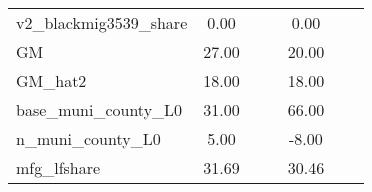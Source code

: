 \begin{table}[htbp]
\begin{tabular}{l*{2}{ccc}}
v2\_blackmig3539\_share&        0.00&            &            &        0.00&            &            \\
GM                  &       27.00&            &            &       20.00&            &            \\
GM\_hat2             &       18.00&            &            &       18.00&            &            \\
base\_muni\_county\_L0 &       31.00&            &            &       66.00&            &            \\
n\_muni\_county\_L0    &        5.00&            &            &       -8.00&            &            \\
mfg\_lfshare         &       31.69&            &            &       30.46&            &            \\
\bottomrule
\end{tabular}
\end{table}
